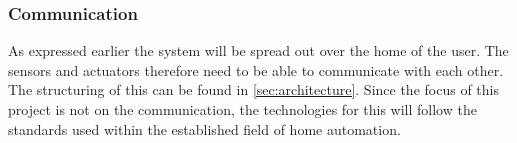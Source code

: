 \subsubsection{Communication}
As expressed earlier the system will be spread out over the home of the user. The sensors and actuators therefore need to be able to communicate with each other. The structuring of this can be found in \cref{sec:architecture}. Since the focus of this project is not on the communication, the technologies for this will follow the standards used within the established field of home automation.

